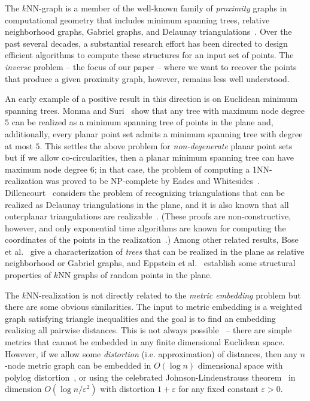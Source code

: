 \documentclass[english]{lipics-v2021}
\begin{document}
The $k$NN-graph is a member of the well-known family of \emph{proximity} graphs in computational geometry that includes minimum spanning trees, relative neighborhood graphs, Gabriel graphs, and Delaunay triangulations~\cite{cgbook}. Over the past several decades, a substantial research effort has been directed to design efficient algorithms to compute these structures for an input set of points.  The \emph{inverse} problem -- the focus of our paper -- where we want to recover the points that produce a given proximity graph, however, remains  less well understood.

An early example of a positive result in this direction is on Euclidean minimum spanning trees. Monma and Suri~\cite{monma:1992} show that any tree with maximum node degree $5$ can be realized as a minimum spanning tree of points in the plane and, additionally, every planar point set admits a minimum spanning tree with degree at most $5$. This settles the above problem for \textit{non-degenerate} planar point sets but if we allow co-circularities, then a planar minimum spanning tree can have maximum node degree $6$; in that case, the problem of computing a 1NN-realization was proved to be NP-complete by Eades and Whitesides~\cite{eades:1994}.
Dillencourt~\cite{dillencourt:1990} considers the problem of recognizing triangulations that can be realized as Delaunay triangulations in the plane, and it is also known that all outerplanar triangulations are realizable~\cite{sugihara:1994}. (These proofs are non-constructive, however, and only exponential time algorithms are known for computing the coordinates of the points in the realization~\cite{agrawal:2022}.)
Among other related results, Bose et al.~\cite{Jit-prox} give a characterization of  \emph{trees} that can be realized in the plane as relative neighborhood or Gabriel graphs, and Eppstein et al.~\cite{Epps-nn} establish some  structural properties of $k$NN graphs of random points in the plane.

The $k$NN-realization is not directly related to the
\emph{metric embedding} problem but there are some obvious similarities. The input to metric embedding is a weighted graph satisfying triangle inequalities and the goal is to find an embedding realizing all pairwise distances. This is not always possible~\cite{matousek-book} -- there are simple metrics that cannot be embedded in any finite dimensional Euclidean space. However, if we allow some \emph{distortion} (i.e. approximation) of distances, then any $n$-node metric graph can be embedded in $O(\log n)$ dimensional space with polylog distortion~\cite{bourgain}, or using the celebrated Johnson-Lindenstrauss theorem~\cite{johnson:1984} in dimension $O(\log n /\varepsilon^2 )$ with distortion $1 + \varepsilon$ for any fixed constant $\varepsilon > 0$.
\end{document}
